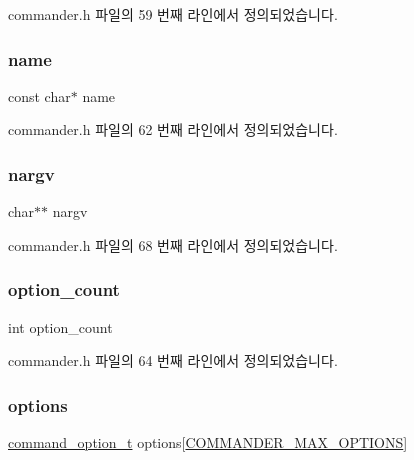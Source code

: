 commander.\+h 파일의 59 번째 라인에서 정의되었습니다.

\mbox{\label{structcommand_a8f8f80d37794cde9472343e4487ba3eb}} 
\subsubsection{\texorpdfstring{name}{name}}
{\footnotesize\ttfamily const char$\ast$ name}



commander.\+h 파일의 62 번째 라인에서 정의되었습니다.

\mbox{\label{structcommand_a3397675d6ecb269951a11a8654e503e5}} 
\subsubsection{\texorpdfstring{nargv}{nargv}}
{\footnotesize\ttfamily char$\ast$$\ast$ nargv}



commander.\+h 파일의 68 번째 라인에서 정의되었습니다.

\mbox{\label{structcommand_aa1c4da4dcba08b1cacc8872e16c064d3}} 
\subsubsection{\texorpdfstring{option\+\_\+count}{option\_count}}
{\footnotesize\ttfamily int option\+\_\+count}



commander.\+h 파일의 64 번째 라인에서 정의되었습니다.

\mbox{\label{structcommand_a6873c7f9bafefe7bae8d4442016ecc6e}} 
\subsubsection{\texorpdfstring{options}{options}}
{\footnotesize\ttfamily \mbox{\hyperlink{structcommand__option__t}{command\+\_\+option\+\_\+t}} options\mbox{[}\mbox{\hyperlink{commander_8h_aa331c32db06b1bdd12d08678dcd72b08}{C\+O\+M\+M\+A\+N\+D\+E\+R\+\_\+\+M\+A\+X\+\_\+\+O\+P\+T\+I\+O\+NS}}\mbox{]}}



